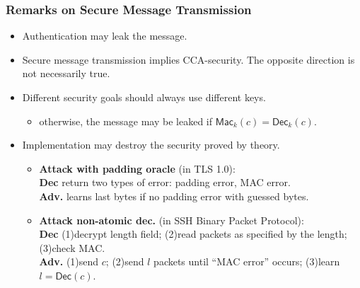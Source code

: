 \begin{comment}
\begin{frame}\frametitle{Authenticated Encryption Theory and Practice}
\begin{theorem}
$\Pi_E$ is CPA-secure and $\Pi_E$ is a secure MAC with unique tages, $\Pi'$ deriving from encrypt-then-authenticate approach is secure.
\end{theorem}
\textbf{GCM(Galois/Counter Mode)}: CTR encryption then Galois MAC. (RFC4106/4543/5647/5288 on IPsec/SSH/TLS)\\
\textbf{EAX}: CTR encryption then CMAC.
\begin{proposition}
Encrypt-then-authenticate approach is secure if $\Pi_E$ is rand-CTR mode or rand-CBC mode.
\end{proposition}
\textbf{CCM (Counter with CBC-MAC)}: CBC-MAC then CTR encryption. (802.11i, RFC3610)\\
\textbf{OCB (Offset Codebook Mode)}: integrating MAC into ENC. (two times fast as CCM, EAX)\\
\textbf{All support AEAD (A.E. with associated data):} part of message is in clear, and all is authenticated.
\end{frame}
\end{comment}
\begin{frame}\frametitle{Remarks on Secure Message Transmission}
\begin{itemize}
\item Authentication may leak the message.
\item Secure message transmission implies CCA-security. The opposite direction is not necessarily true.
\item Different security goals should always use different keys.
\begin{itemize}
\item otherwise, the message may be leaked if $\mathsf{Mac}_k(c)=\mathsf{Dec}_k(c)$.
\end{itemize}
\item Implementation may destroy the security proved by theory.
\begin{itemize}
\item \textbf{Attack with padding oracle} (in TLS 1.0): \\
\textbf{Dec} return two types of error: padding error, MAC error. \\
\textbf{Adv.} learns last bytes if no padding error with guessed bytes. 
\item \textbf{Attack non-atomic dec.} (in SSH Binary Packet Protocol):\\
\textbf{Dec} (1)decrypt length field; (2)read packets as specified by the length; (3)check MAC. \\
\textbf{Adv.} (1)send $c$; (2)send $l$ packets until ``MAC error'' occurs; (3)learn $l = \mathsf{Dec}(c)$. 
\end{itemize}
\end{itemize}
\end{frame}
